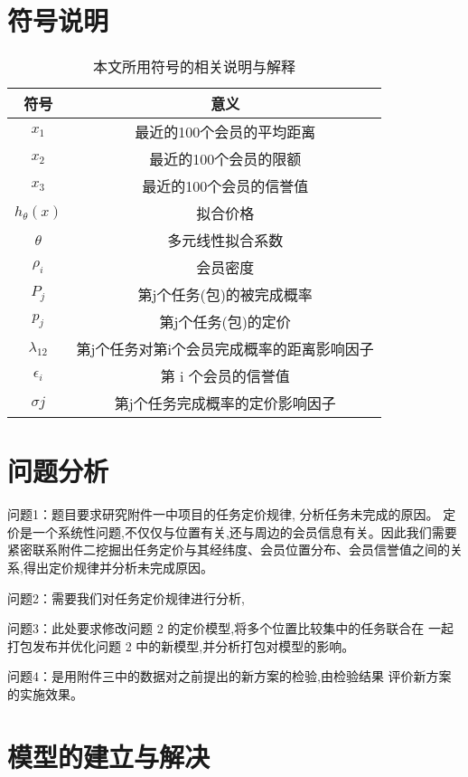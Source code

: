 \documentclass{cumcmthesis}
\begin{document}
\section{符号说明}

\begin{table}[!htp]
\centering
\caption{本文所用符号的相关说明与解释}\label{Tab:1}
\begin{tabular}{cc}
 \toprule[1.5pt]
符号 &   意义 \\ 
\midrule
 $x_1$ & 最近的100个会员的平均距离 \\
 $x_2$ & 最近的100个会员的限额 \\  
 $x_3$ & 最近的100个会员的信誉值 \\ 
 $h_\theta\left(x\right)  $  & 拟合价格 \\ 
$\theta$	    & 多元线性拟合系数  \\ 
 $\rho_i$	    & 会员密度  \\ 
 $P_j$	    & 第j个任务(包)的被完成概率  \\
  $p_j$	    & 第j个任务(包)的定价  \\ 
  $\lambda_{12}$& 第j个任务对第i个会员完成概率的距离影响因子  \\ 
  $\epsilon_i$ & 第 i 个会员的信誉值\\ 
  $\sigma{j}$ & 第j个任务完成概率的定价影响因子\\ 
\bottomrule[1.5pt]
\end{tabular}
\end{table}

\section{问题分析}

问题1：题目要求研究附件一中项目的任务定价规律, 分析任务未完成的原因。 定价是一个系统性问题,不仅仅与位置有关,还与周边的会员信息有关。因此我们需要紧密联系附件二挖掘出任务定价与其经纬度、会员位置分布、会员信誉值之间的关系,得出定价规律并分析未完成原因。

问题2：需要我们对任务定价规律进行分析,

问题3：此处要求修改问题 2 的定价模型,将多个位置比较集中的任务联合在 一起打包发布并优化问题 2 中的新模型,并分析打包对模型的影响。 

问题4：是用附件三中的数据对之前提出的新方案的检验,由检验结果 评价新方案的实施效果。 
\section{模型的建立与解决}
\end{document}
